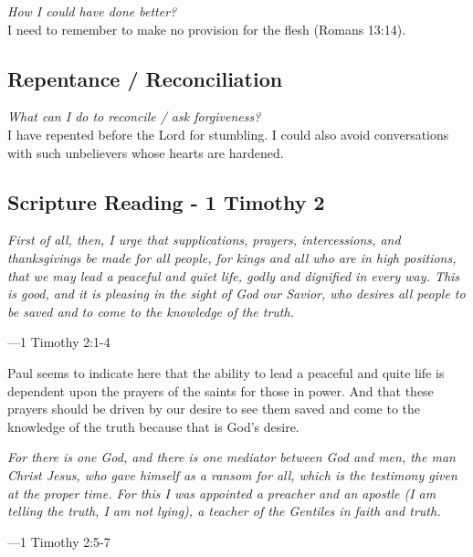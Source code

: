 \textit{How I could have done better?} \\

I need to remember to make no provision for the flesh (Romans 13:14).

\subsection*{Repentance / Reconciliation}

\textit{What can I do to reconcile / ask forgiveness?} \\

I have repented before the Lord for stumbling. I could also avoid conversations with such unbelievers whose hearts are hardened.

\subsection*{Scripture Reading - 1 Timothy 2}

\vspace*{0.5cm}
\begin{center}
	\normalsize{\parbox{10.5cm}{
		\begin{raggedright}
		{\normalsize 
			\textit{First of all, then, I urge that supplications, prayers, intercessions,
            and thanksgivings be made for all people, for kings and all who are in 
            high positions, that we may lead a peaceful and quiet life, godly and 
            dignified in every way. This is good, and it is pleasing in the sight of 
            God our Savior, who desires all people to be saved and to come to the 
            knowledge of the truth.}
		}

		\vspace{.25cm}\hfill{---1 Timothy 2:1-4}
		\end{raggedright}
	}
}
\end{center}

Paul seems to indicate here that the ability to lead a peaceful and quite life is dependent upon the prayers of the saints for those in power. And that these prayers should be driven by our desire to see them saved and come to the knowledge of the truth because that is God's desire.

\vspace*{0.5cm}
\begin{center}
	\normalsize{\parbox{10.5cm}{
		\begin{raggedright}
		{\normalsize 
			\textit{For there is one God, and there is one mediator 
            between God and men, the man Christ Jesus, who gave himself as a ransom 
            for all, which is the testimony given at the proper time. For this I was 
            appointed a preacher and an apostle (I am telling the truth, I am not lying), 
            a teacher of the Gentiles in faith and truth.}
		}

		\vspace{.25cm}\hfill{---1 Timothy 2:5-7}
		\end{raggedright}
	}
}
\end{center}

